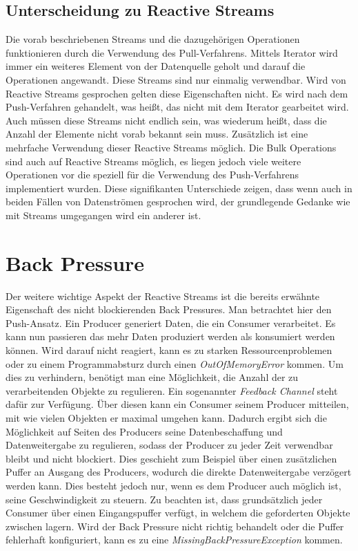 \subsection{Unterscheidung zu Reactive Streams}
Die vorab beschriebenen Streams und die dazugehörigen Operationen funktionieren durch die Verwendung des Pull-Verfahrens. Mittels Iterator wird immer ein weiteres Element von der Datenquelle geholt und darauf die Operationen angewandt. Diese Streams sind nur einmalig verwendbar. Wird von Reactive Streams gesprochen gelten diese Eigenschaften nicht. Es wird nach dem Push-Verfahren gehandelt, was heißt, das nicht mit dem Iterator gearbeitet wird. Auch müssen diese Streams nicht endlich sein, was wiederum heißt, dass die Anzahl der Elemente nicht vorab bekannt sein muss. Zusätzlich ist eine mehrfache Verwendung dieser Reactive Streams möglich. Die Bulk Operations sind auch auf Reactive Streams möglich, es liegen jedoch viele weitere Operationen vor die speziell für die Verwendung des Push-Verfahrens implementiert wurden. Diese signifikanten Unterschiede zeigen, dass wenn auch in beiden Fällen von Datenströmen gesprochen wird, der grundlegende Gedanke wie mit Streams umgegangen wird ein anderer ist.
\section{Back Pressure}
Der weitere wichtige Aspekt der Reactive Streams ist die bereits erwähnte Eigenschaft des nicht blockierenden Back Pressures. Man betrachtet hier den Push-Ansatz. Ein Producer generiert Daten, die ein Consumer verarbeitet. Es kann nun passieren das mehr Daten produziert werden als konsumiert werden können. Wird darauf nicht reagiert, kann es zu starken Ressourcenproblemen oder zu einem Programmabsturz durch einen \textit{OutOfMemoryError} kommen. Um dies zu verhindern, benötigt man eine Möglichkeit, die Anzahl der zu verarbeitenden Objekte zu regulieren. Ein sogenannter \textit{Feedback Channel} steht dafür zur Verfügung. Über diesen kann ein Consumer seinem Producer mitteilen, mit wie vielen Objekten er maximal umgehen kann. Dadurch ergibt sich die Möglichkeit auf Seiten des Producers seine Datenbeschaffung und Datenweitergabe zu regulieren, sodass der Producer zu jeder Zeit verwendbar bleibt und nicht blockiert. Dies geschieht zum Beispiel über einen zusätzlichen Puffer an Ausgang des Producers, wodurch die direkte Datenweitergabe verzögert werden kann. Dies besteht jedoch nur, wenn es dem Producer auch möglich ist, seine Geschwindigkeit zu steuern. Zu beachten ist, dass grundsätzlich jeder Consumer über einen Eingangspuffer verfügt, in welchem die geforderten Objekte zwischen lagern. Wird der Back Pressure nicht richtig behandelt oder die Puffer fehlerhaft konfiguriert, kann es zu eine \textit{MissingBackPressureException} kommen.
